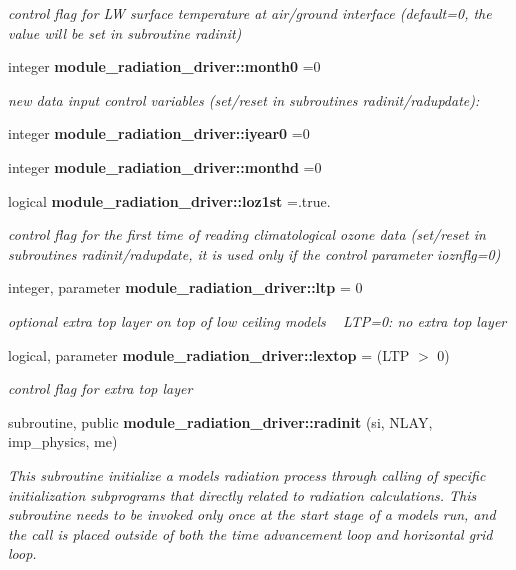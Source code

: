 \begin{DoxyCompactItemize}
\begin{DoxyCompactList}\small\item\em control flag for LW surface temperature at air/ground interface (default=0, the value will be set in subroutine radinit) \end{DoxyCompactList}\item 
integer \textbf{ module\+\_\+radiation\+\_\+driver\+::month0} =0
\begin{DoxyCompactList}\small\item\em new data input control variables (set/reset in subroutines radinit/radupdate)\+: \end{DoxyCompactList}\item 
integer \textbf{ module\+\_\+radiation\+\_\+driver\+::iyear0} =0
\item 
integer \textbf{ module\+\_\+radiation\+\_\+driver\+::monthd} =0
\item 
logical \textbf{ module\+\_\+radiation\+\_\+driver\+::loz1st} =.true.
\begin{DoxyCompactList}\small\item\em control flag for the first time of reading climatological ozone data (set/reset in subroutines radinit/radupdate, it is used only if the control parameter ioznflg=0) \end{DoxyCompactList}\item 
integer, parameter \textbf{ module\+\_\+radiation\+\_\+driver\+::ltp} = 0
\begin{DoxyCompactList}\small\item\em optional extra top layer on top of low ceiling models ~\newline
 L\+TP=0\+: no extra top layer \end{DoxyCompactList}\item 
logical, parameter \textbf{ module\+\_\+radiation\+\_\+driver\+::lextop} = (L\+TP $>$ 0)
\begin{DoxyCompactList}\small\item\em control flag for extra top layer \end{DoxyCompactList}\item 
subroutine, public \textbf{ module\+\_\+radiation\+\_\+driver\+::radinit} (si, N\+L\+AY, imp\+\_\+physics, me)
\begin{DoxyCompactList}\small\item\em This subroutine initialize a model\textquotesingle{}s radiation process through calling of specific initialization subprograms that directly related to radiation calculations. This subroutine needs to be invoked only once at the start stage of a model\textquotesingle{}s run, and the call is placed outside of both the time advancement loop and horizontal grid loop. \end{DoxyCompactList}\end{DoxyCompactItemize}
